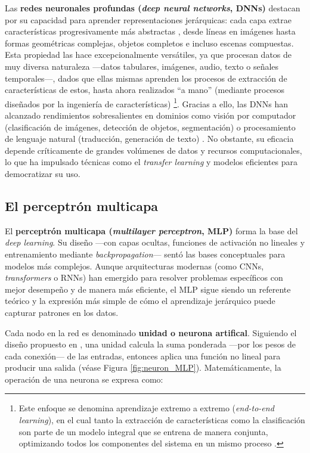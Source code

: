 Las \textbf{redes neuronales profundas (\textit{deep neural networks}, DNNs)} destacan por su capacidad para 
aprender representaciones jerárquicas: cada capa extrae características progresivamente más abstractas 
\cite{lecun2015}, desde líneas en imágenes hasta formas geométricas complejas, objetos completos e incluso 
escenas compuestas.
Esta propiedad las hace excepcionalmente versátiles, ya que procesan datos de muy diversa naturaleza ---datos 
tabulares, imágenes, audio, texto o señales temporales---, dados que ellas mismas aprenden los procesos de 
extracción de características de estos, hasta ahora realizados ``a mano'' (mediante procesos diseñados por la 
ingeniería de características) \cite{rusell2021} \footnote{Este enfoque se denomina aprendizaje extremo a
extremo (\textit{end-to-end learning}), en el cual tanto la extracción de características como la clasificación
son parte de un modelo integral que se entrena de manera conjunta, optimizando todos los componentes del sistema
en un mismo proceso \cite{rusell2021}.}. Gracias a ello, las DNNs han alcanzado rendimientos sobresalientes en 
dominios como visión por computador
(clasificación de imágenes, detección de objetos, segmentación) o procesamiento de lenguaje natural 
(traducción, generación de texto) \cite{redhat2024DeepLearningDefinition}.
No obstante, su eficacia depende críticamente de grandes volúmenes de datos y recursos computacionales,
lo que ha impulsado técnicas como el \textit{transfer learning} y modelos eficientes para democratizar 
su uso.


\subsection{El perceptrón multicapa}

El \textbf{perceptrón multicapa (\textit{multilayer perceptron}, MLP)} forma la base del \textit{deep learning}. 
Su diseño ---con capas ocultas, funciones de activación no lineales y entrenamiento  mediante 
\textit{backpropagation}--- sentó las bases conceptuales para modelos más complejos. Aunque arquitecturas 
modernas (como CNNs, \textit{transformers} o RNNs) han emergido para resolver problemas específicos con 
mejor desempeño y de manera más eficiente, el MLP sigue siendo un referente teórico y la expresión más 
simple de cómo el aprendizaje jerárquico puede capturar patrones en los datos. 

Cada nodo en la red es denominado \textbf{unidad o neurona artifical}. Siguiendo el diseño propuesto en 
\cite{mcculloch1943}, una unidad calcula la suma ponderada ---por los pesos de cada conexión--- de las
entradas, entonces aplica una función no lineal para producir una salida (véase Figura \ref{fig:neuron_MLP}).
Matemáticamente, la operación de una neurona se expresa como:

